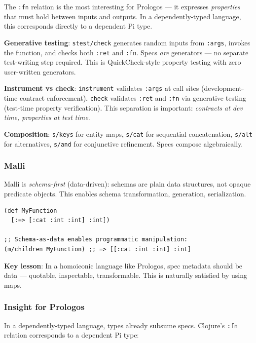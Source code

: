 \documentclass[11pt]{article}
\begin{document}
The \texttt{:fn} relation is the most interesting for Prologos --- it expresses
\emph{properties} that must hold between inputs and outputs. In a dependently-typed
language, this corresponds directly to a dependent Pi type.

\textbf{Generative testing}: \texttt{stest/check} generates random inputs from \texttt{:args},
invokes the function, and checks both \texttt{:ret} and \texttt{:fn}. Specs \emph{are} generators
--- no separate test-writing step required. This is QuickCheck-style property
testing with zero user-written generators.

\textbf{Instrument vs check}: \texttt{instrument} validates \texttt{:args} at call sites
(development-time contract enforcement). \texttt{check} validates \texttt{:ret} and \texttt{:fn} via
generative testing (test-time property verification). This separation is
important: \emph{contracts at dev time, properties at test time}.

\textbf{Composition}: \texttt{s/keys} for entity maps, \texttt{s/cat} for sequential concatenation,
\texttt{s/alt} for alternatives, \texttt{s/and} for conjunctive refinement. Specs compose
algebraically.
\subsubsection{Malli}
\label{sec:org8d95780}

Malli is \emph{schema-first} (data-driven): schemas are plain data structures, not
opaque predicate objects. This enables schema transformation, generation,
serialization.

\begin{verbatim}
(def MyFunction
  [:=> [:cat :int :int] :int])

;; Schema-as-data enables programmatic manipulation:
(m/children MyFunction) ;; => [[:cat :int :int] :int]
\end{verbatim}

\textbf{Key lesson}: In a homoiconic language like Prologos, spec metadata should be
data --- quotable, inspectable, transformable. This is naturally satisfied by
using maps.
\subsubsection{Insight for Prologos}
\label{sec:orgd66419d}

In a dependently-typed language, types already subsume specs. Clojure's \texttt{:fn}
relation corresponds to a dependent Pi type:
\end{document}
